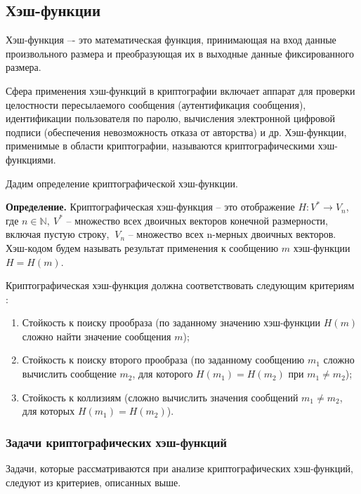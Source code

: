\subsection{Хэш-функции}
Хэш-функция –- это математическая функция, принимающая на вход данные произвольного размера и преобразующая их в выходные данные фиксированного размера.

Сфера применения хэш-функций в криптографии включает аппарат для проверки целостности пересылаемого сообщения (аутентификация сообщения), идентификации пользователя по паролю, вычисления электронной цифровой подписи (обеспечения невозможность отказа от авторства) и др. 
Хэш-функции, применимые в области криптографии, называются криптографическими хэш-функциями.

Дадим определение криптографической хэш-функции. 

 \textbf{Определение.} Криптографическая хэш-функция -- это отображение $H\colon V^* \rightarrow V_n$, где $n\in \mathbb{N}, \ V^*$ -- множество всех двоичных векторов конечной размерности, включая пустую строку, $\ V_n$ -- множество всех n-мерных двоичных векторов. Хэш-кодом будем называть результат применения к сообщению $m$ хэш-функции $H = H(m)$.

Криптографическая хэш-функция должна соответствовать следующим критериям \cite{criteria}:
\begin{enumerate} 
\item Стойкость к поиску прообраза (по заданному значению хэш-функции $H(m)$ сложно найти значение сообщения $m$);
\item Стойкость к поиску второго прообраза (по заданному сообщению $m_1$ сложно вычислить сообщение $m_2$, для которого $H(m_1) = H(m_2)$ при $m_1 \neq m_2$);
\item Стойкость к коллизиям (сложно вычислить значения сообщений $m_1 \neq m_2$, для которых $H(m_1) = H(m_2)$).
\end{enumerate}

\subsubsection{Задачи криптографических хэш-функций}
Задачи, которые рассматриваются при анализе криптографических хэш-функций, следуют из критериев, описанных выше. 

